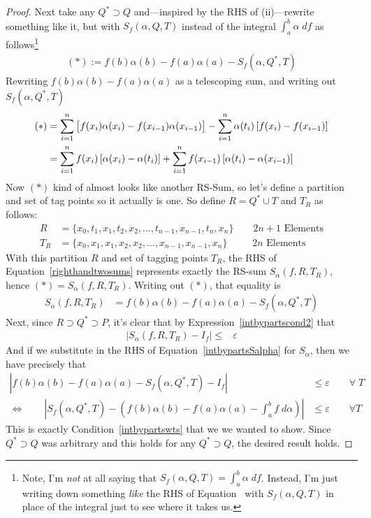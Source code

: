 \documentclass[12pt]{article}
\numberwithin{equation}{section} %
\theoremstyle{plain}
\theoremstyle{definition}
\theoremstyle{remark}
\begin{document}
\begin{proof}
Next take any $Q^*\supset Q$ and---inspired by the RHS of (ii)---rewrite
something like it, but with $S_f(\alpha,Q,T)$ instead of the integral
$\int^b_a \alpha \; df$ as follows\footnote{%
  Note, I'm \emph{not} at all saying that
  $S_f(\alpha,Q,T)=\int^b_a\alpha\;df$.
  Instead, I'm just writing down something \emph{like} the RHS of
  Equation~ with $S_f(\alpha,Q,T)$ in place of the
  integral just to see where it takes us.
}
\begin{align*}
  (*) :=
  f(b) \alpha(b) - f(a)\alpha(a) - S_f(\alpha,Q^*,T)
\end{align*}
Rewriting $f(b)\alpha(b)-f(a)\alpha(a)$ as a telescoping sum, and
writing out $S_f(\alpha,Q^*,T)$
\begin{align}
  (*)
    &= \sum^n_{i=1}
    \big[
    f(x_i) \alpha(x_i) - f(x_{i-1}) \alpha(x_{i-1})
    \big]
    - \sum^n_{i=1} \alpha(t_i) \left[f(x_i) - f(x_{i-1})
    \right]
  \notag\\
  &= \sum^n_{i=1} f(x_i) \left[\alpha(x_i) - \alpha(t_i) \right]
      +\sum^n_{i=1} f(x_{i-1}) \left[\alpha(t_i)
    - \alpha(x_{i-1})\right]\label{righthandtwosums}
\end{align}
Now $(*)$ kind of almost looks like another RS-Sum, so let's define a
partition and set of tag points so it actually is one. So define
$R=Q^*\cup T$ and $T_R$ as follows:
\begin{align*}
  R &= \{x_0,t_1,x_1,t_2,x_2,\ldots,t_{n-1},x_{n-1},t_n,x_n\}
  \qquad \text{$2n+1$ Elements}
  \\
  T_R &= \{ x_0, x_1, x_1, x_2, x_2,\ldots, x_{n-1},x_{n-1},x_n \}
  \qquad\;\; \text{$2n$ Elements}
\end{align*}
With this partition $R$ and set of tagging points $T_R$, the RHS of
Equation~\ref{righthandtwosums} represents exactly the RS-sum
$ S_\alpha(f, R, T_R)$, hence $(*)=S_\alpha(f,R,T_R)$.
Writing out $(*)$, that equality is
\begin{align}
    S_\alpha(f,R,T_R) &=
    f(b) \alpha(b) - f(a)\alpha(a) - S_f(\alpha,Q^*,T)
    \label{intbypartsSalpha}
\end{align}
Next, since $R\supset Q^* \supset P$, it's clear that by
Expression~\ref{intbypartscond2} that
\begin{align*}
  \left\lvert S_\alpha(f,R,T_R) - I_f \right\rvert \leq &\varepsilon
\end{align*}
And if we substitute in the RHS of Equation~\ref{intbypartsSalpha} for
$S_\alpha$, then we have precisely that
\begin{align*}
    \left\lvert f(b) \alpha(b) - f(a)\alpha(a)
    - S_f(\alpha,Q^*,T) -
    I_f
    \right\rvert
    &\leq
    \varepsilon \qquad \forall \; T
    \\
    \iff\qquad
    \left\lvert
    S_f(\alpha,Q^*,T)
    -
    \left(
    f(b) \alpha(b) - f(a)\alpha(a) - \int^b_a f\; d\alpha
    \right)
    \right\rvert
    &\leq
    \varepsilon
    \qquad\forall T
\end{align*}
This is exactly Condition~\ref{intbypartswts} that we we wanted to show.
Since $Q^*\supset Q$ was arbitrary and this holds for any
$Q^*\supset Q$, the desired result holds.
\end{proof}
\end{document}
